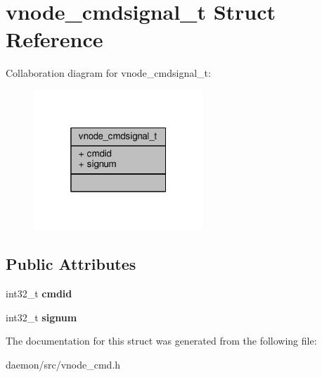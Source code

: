 \hypertarget{structvnode__cmdsignal__t}{\section{vnode\+\_\+cmdsignal\+\_\+t Struct Reference}
\label{structvnode__cmdsignal__t}
}


Collaboration diagram for vnode\+\_\+cmdsignal\+\_\+t\+:
\nopagebreak
\begin{figure}[H]
\begin{center}
\leavevmode
\includegraphics[width=181pt]{structvnode__cmdsignal__t__coll__graph}
\end{center}
\end{figure}
\subsection*{Public Attributes}
\begin{DoxyCompactItemize}
\item 
\hypertarget{structvnode__cmdsignal__t_a20e945cf9696bd1ed0568a16e9c4b7bd}{int32\+\_\+t {\bfseries cmdid}}\label{structvnode__cmdsignal__t_a20e945cf9696bd1ed0568a16e9c4b7bd}

\item 
\hypertarget{structvnode__cmdsignal__t_a3d24b7b34f9a20cf76c722727e86246b}{int32\+\_\+t {\bfseries signum}}\label{structvnode__cmdsignal__t_a3d24b7b34f9a20cf76c722727e86246b}

\end{DoxyCompactItemize}


The documentation for this struct was generated from the following file\+:\begin{DoxyCompactItemize}
\item 
daemon/src/vnode\+\_\+cmd.\+h\end{DoxyCompactItemize}
